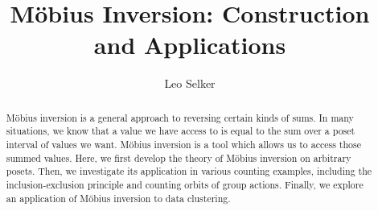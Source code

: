 \documentclass[12pt]{pom_thesis}
\author{Leo Selker}
\title{M\"obius Inversion: Construction and Applications}
\begin{document}
\maketitle

\begin{abstract}M\"obius inversion is a general approach to reversing certain kinds of sums. In many situations, we know that a value we have access to is equal to the sum over a poset interval of values we want. M\"obius inversion is a tool which allows us to access those summed values. Here, we first develop the theory of M\"obius inversion on arbitrary posets. Then, we investigate its application in various counting examples, including the inclusion-exclusion principle and counting orbits of group actions. Finally, we explore an application of M\"obius inversion to data clustering.
\end{abstract}

\tableofcontents
\end{document}
